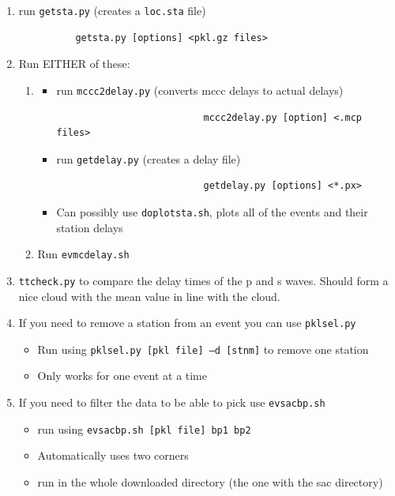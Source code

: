 \documentclass[letterpaper,10pt]{article}
\begin{document}
\begin{enumerate}
  \item run \verb"getsta.py" (creates a \verb"loc.sta" file)
        \begin{verbatim}
          getsta.py [options] <pkl.gz files>
        \end{verbatim}
  \item Run EITHER of these: 
        \begin{enumerate}
          \item \begin{itemize}
                  \item run \verb"mccc2delay.py" (converts mccc delays to actual delays)
                        \begin{verbatim}
                          mccc2delay.py [option] <.mcp files>
                        \end{verbatim}
                  \item run \verb"getdelay.py" (creates a delay file)
                        \begin{verbatim}
                          getdelay.py [options] <*.px>
                        \end{verbatim}
                  \item Can possibly use \verb"doplotsta.sh", plots all of the events and their station delays
                \end{itemize}
          \item Run \verb"evmcdelay.sh"
        \end{enumerate}
  \item \verb"ttcheck.py" to compare the delay times of the p and s waves. Should form a nice cloud with the mean value in line with the cloud.
  \item If you need to remove a station from an event you can use \verb"pklsel.py"
        \begin{itemize}
          \item Run using \verb"pklsel.py [pkl file] –d [stnm]" to remove one station
          \item Only works for one event at a time
        \end{itemize}
  \item If you need to filter the data to be able to pick use \verb"evsacbp.sh"
        \begin{itemize}
          \item run using \verb"evsacbp.sh [pkl file] bp1 bp2"
          \item Automatically uses two corners
          \item run in the whole downloaded directory (the one with the sac directory)
        \end{itemize}
\end{enumerate}





\end{document}
